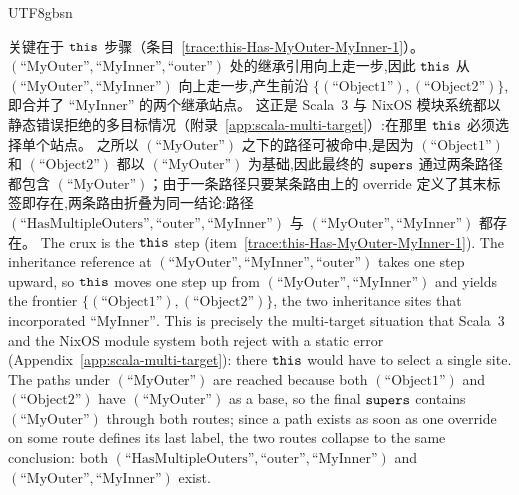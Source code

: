 \begin{CJK*}{UTF8}{gbsn}
\begin{remark}
\sloppy
\ifPaperChinese
  关键在于 $\mathtt{this}$ 步骤（条目~\ref{trace:this-Has-MyOuter-MyInner-1}）。
  $(\text{``MyOuter''}, \text{``MyInner''}, \text{``outer''})$ 处的继承引用向上走一步,因此 $\mathtt{this}$ 从 $(\text{``MyOuter''}, \text{``MyInner''})$ 向上走一步,产生前沿 $\{(\text{``Object1''}), (\text{``Object2''})\}$,即合并了 $\text{``MyInner''}$ 的两个继承站点。
  这正是 Scala~3 与 NixOS 模块系统都以静态错误拒绝的多目标情况（附录~\ref{app:scala-multi-target}）:在那里 $\mathtt{this}$ 必须选择单个站点。
  之所以 $(\text{``MyOuter''})$ 之下的路径可被命中,是因为 $(\text{``Object1''})$ 和 $(\text{``Object2''})$ 都以 $(\text{``MyOuter''})$ 为基础,因此最终的 $\mathtt{supers}$ 通过两条路径都包含 $(\text{``MyOuter''})$；由于一条路径只要某条路由上的 override 定义了其末标签即存在,两条路由折叠为同一结论:路径 $(\text{``HasMultipleOuters''}, \text{``outer''}, \text{``MyInner''})$ 与 $(\text{``MyOuter''}, \text{``MyInner''})$ 都存在。
\else
  The crux is the $\mathtt{this}$ step (item~\ref{trace:this-Has-MyOuter-MyInner-1}).
  The inheritance reference at
  $(\text{``MyOuter''}, \text{``MyInner''}, \text{``outer''})$ takes one step
  upward, so $\mathtt{this}$ moves one step up from
  $(\text{``MyOuter''}, \text{``MyInner''})$ and yields the frontier
  $\{(\text{``Object1''}), (\text{``Object2''})\}$, the two inheritance
  sites that incorporated $\text{``MyInner''}$. This is precisely the
  multi-target situation that Scala~3 and the NixOS module system both reject
  with a static error (Appendix~\ref{app:scala-multi-target}): there $\mathtt{this}$
  would have to select a single site. The paths under $(\text{``MyOuter''})$
  are reached because both $(\text{``Object1''})$ and
  $(\text{``Object2''})$ have $(\text{``MyOuter''})$ as a base, so the final
  $\mathtt{supers}$ contains $(\text{``MyOuter''})$ through both routes; since
  a path exists as soon as one override on some route defines its last label,
  the two routes collapse to the same conclusion: both
  $(\text{``HasMultipleOuters''}, \text{``outer''}, \text{``MyInner''})$ and
  $(\text{``MyOuter''}, \text{``MyInner''})$ exist.
\fi
\end{remark}

\ifPaperChinese\clearpage\end{CJK*}\fi

